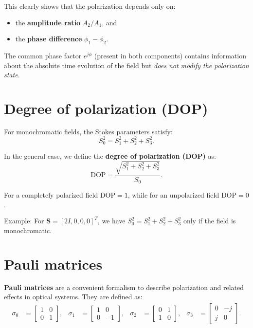 This clearly shows that the polarization depends only on:
\begin{itemize}
    \item the \textbf{amplitude ratio} $A_2/A_1$, and
    \item the \textbf{phase difference} $\phi_1 - \phi_2$.
\end{itemize}

The common phase factor $e^{j\phi}$ (present in both components) contains information about the absolute time evolution of the field but \emph{does not modify the polarization state}.



\section{Degree of polarization (DOP)}

For monochromatic fields, the Stokes parameters satisfy:
\begin{equation}
    S_0^2 = S_1^2 + S_2^2 + S_3^2.
\end{equation}

In the general case, we define the \textbf{degree of polarization (DOP)} as:
\begin{equation}
    \mathrm{DOP} = \frac{\sqrt{S_1^2 + S_2^2 + S_3^2}}{S_0}.
\end{equation}

For a completely polarized field $\mathrm{DOP}=1$,  
while for an unpolarized field $\mathrm{DOP}=0$.

\medskip
Example:  
For $\mathbf{S} = [2I, 0, 0, 0]^T$, we have $S_0^2 = S_1^2 + S_2^2 + S_3^2$ only if the field is monochromatic.

\section{Pauli matrices}

\textbf{Pauli matrices} are a convenient formalism to describe polarization and related effects in optical systems.  
They are defined as:
\begin{align}
    \sigma_0 &= 
    \begin{bmatrix}1 & 0\\ 0 & 1\end{bmatrix}, &
    \sigma_1 &= 
    \begin{bmatrix}1 & 0\\ 0 & -1\end{bmatrix}, &
    \sigma_2 &=
    \begin{bmatrix}0 & 1\\ 1 & 0\end{bmatrix}, &
    \sigma_3 &=
    \begin{bmatrix}0 & -j\\ j & 0\end{bmatrix}.
\end{align}

